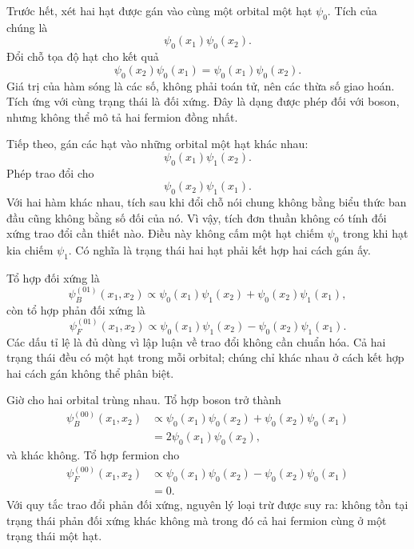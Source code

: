 Trước hết, xét hai hạt được gán vào cùng một orbital một hạt \(\psi_0\). Tích của chúng là
\begin{equation}
\psi_0(x_1)\psi_0(x_2).
\end{equation}
Đổi chỗ tọa độ hạt cho kết quả
\begin{equation}
\psi_0(x_2)\psi_0(x_1)
=
\psi_0(x_1)\psi_0(x_2).
\end{equation}
Giá trị của hàm sóng là các số, không phải toán tử, nên các thừa số giao hoán. Tích ứng với cùng trạng thái là đối xứng. Đây là dạng được phép đối với boson, nhưng không thể mô tả hai fermion đồng nhất.

Tiếp theo, gán các hạt vào những orbital một hạt khác nhau:
\begin{equation}
\psi_0(x_1)\psi_1(x_2).
\end{equation}
Phép trao đổi cho
\begin{equation}
\psi_0(x_2)\psi_1(x_1).
\end{equation}
Với hai hàm khác nhau, tích sau khi đổi chỗ nói chung không bằng biểu thức ban đầu cũng không bằng số đối của nó. Vì vậy, tích đơn thuần không có tính đối xứng trao đổi cần thiết nào. Điều này không cấm một hạt chiếm \(\psi_0\) trong khi hạt kia chiếm \(\psi_1\). Có nghĩa là trạng thái hai hạt phải kết hợp hai cách gán ấy.

Tổ hợp đối xứng là
\begin{equation}
\psi_B^{(01)}(x_1,x_2)
\propto
\psi_0(x_1)\psi_1(x_2)
+
\psi_0(x_2)\psi_1(x_1),
\end{equation}
còn tổ hợp phản đối xứng là
\begin{equation}
\psi_F^{(01)}(x_1,x_2)
\propto
\psi_0(x_1)\psi_1(x_2)
-
\psi_0(x_2)\psi_1(x_1).
\end{equation}
Các dấu tỉ lệ là đủ dùng vì lập luận về trao đổi không cần chuẩn hóa. Cả hai trạng thái đều có một hạt trong mỗi orbital; chúng chỉ khác nhau ở cách kết hợp hai cách gán không thể phân biệt.

Giờ cho hai orbital trùng nhau. Tổ hợp boson trở thành
\begin{align}
\psi_B^{(00)}(x_1,x_2)
&\propto
\psi_0(x_1)\psi_0(x_2)
+
\psi_0(x_2)\psi_0(x_1)\\
&=
2\psi_0(x_1)\psi_0(x_2),
\end{align}
và khác không. Tổ hợp fermion cho
\begin{align}
\psi_F^{(00)}(x_1,x_2)
&\propto
\psi_0(x_1)\psi_0(x_2)
-
\psi_0(x_2)\psi_0(x_1)\\
&=0.
\end{align}
Với quy tắc trao đổi phản đối xứng, nguyên lý loại trừ được suy ra: không tồn tại trạng thái phản đối xứng khác không mà trong đó cả hai fermion cùng ở một trạng thái một hạt.

